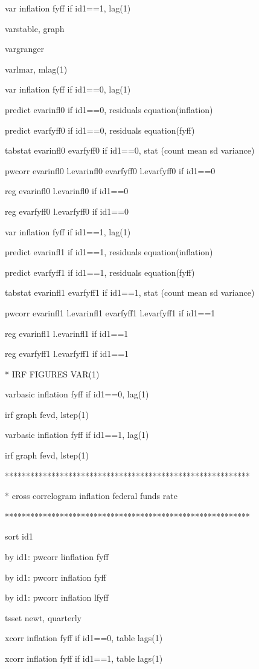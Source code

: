 \documentclass[12pt,a4paper]{article}%
\begin{document}
var inflation fyff if id1==1, lag(1)

varstable, graph

vargranger

varlmar, mlag(1)

var inflation fyff if id1==0, lag(1)

predict evarinfl0 if id1==0, residuals equation(inflation)

predict evarfyff0 if id1==0, residuals equation(fyff)

tabstat evarinfl0 evarfyff0 if id1==0, stat (count mean sd variance)

pwcorr evarinfl0 l.evarinfl0 evarfyff0 l.evarfyff0 if id1==0

reg evarinfl0 l.evarinfl0 if id1==0

reg evarfyff0 l.evarfyff0 if id1==0

var inflation fyff if id1==1, lag(1)

predict evarinfl1 if id1==1, residuals equation(inflation)

predict evarfyff1 if id1==1, residuals equation(fyff)

tabstat evarinfl1 evarfyff1 if id1==1, stat (count mean sd variance)

pwcorr evarinfl1 l.evarinfl1 evarfyff1 l.evarfyff1 if id1==1

reg evarinfl1 l.evarinfl1 if id1==1

reg evarfyff1 l.evarfyff1 if id1==1

* IRF FIGURES VAR(1)

varbasic inflation fyff if id1==0, lag(1)

irf graph fevd, lstep(1)

varbasic inflation fyff if id1==1, lag(1)

irf graph fevd, lstep(1)

**********************************************************

* cross correlogram inflation federal funds rate

**********************************************************

sort id1

by id1: pwcorr linflation fyff

by id1: pwcorr inflation fyff

by id1: pwcorr inflation lfyff

tsset newt, quarterly

xcorr inflation fyff if id1==0, table lags(1)

xcorr inflation fyff if id1==1, table lags(1)
\end{document}
